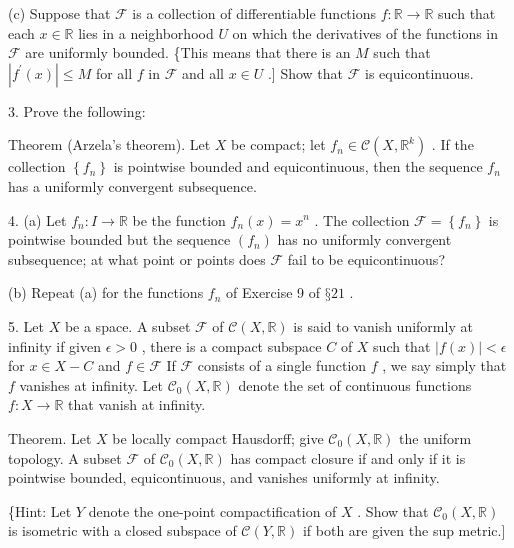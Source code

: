 (c) Suppose that \(\mathcal{F}\) is a collection of differentiable functions \(f : \mathbb{R} \rightarrow  \mathbb{R}\) such that each \(x \in  \mathbb{R}\) lies in a neighborhood \(U\) on which the derivatives of the functions in \(\mathcal{F}\) are uniformly bounded. \{This means that there is an \(M\) such that \(\left| {{f}^{\prime }\left( x\right) }\right|  \leq  M\) for all \(f\) in \(\mathcal{F}\) and all \(x \in  U\) .] Show that \(\mathcal{F}\) is equicontinuous.

3. Prove the following:

Theorem (Arzela’s theorem). Let \(X\) be compact; let \({f}_{n} \in  \mathcal{C}\left( {X,{\mathbb{R}}^{k}}\right)\) . If the collection \(\left\{  {f}_{n}\right\}\) is pointwise bounded and equicontinuous, then the sequence \({f}_{n}\) has a uniformly convergent subsequence.

4. (a) Let \({f}_{n} : I \rightarrow  \mathbb{R}\) be the function \({f}_{n}\left( x\right)  = {x}^{n}\) . The collection \(\mathcal{F} = \left\{  {f}_{n}\right\}\) is pointwise bounded but the sequence \(\left( {f}_{n}\right)\) has no uniformly convergent subsequence; at what point or points does \(\mathcal{F}\) fail to be equicontinuous?

(b) Repeat (a) for the functions \({f}_{n}\) of Exercise 9 of \(§{21}\) .

5. Let \(X\) be a space. A subset \(\mathcal{F}\) of \(\mathcal{C}\left( {X,\mathbb{R}}\right)\) is said to vanish uniformly at infinity if given \(\epsilon  > 0\) , there is a compact subspace \(C\) of \(X\) such that \(\left| {f\left( x\right) }\right|  < \epsilon\) for \(x \in  X - C\) and \(f \in  \mathcal{F}\) If \(\mathcal{F}\) consists of a single function \(f\) , we say simply that \(f\) vanishes at infinity. Let \({\mathcal{C}}_{0}\left( {X,\mathbb{R}}\right)\) denote the set of continuous functions \(f : X \rightarrow  \mathbb{R}\) that vanish at infinity.

Theorem. Let \(X\) be locally compact Hausdorff; give \({\mathcal{C}}_{0}\left( {X,\mathbb{R}}\right)\) the uniform topology. A subset \(\mathcal{F}\) of \({\mathcal{C}}_{0}\left( {X,\mathbb{R}}\right)\) has compact closure if and only if it is pointwise bounded, equicontinuous, and vanishes uniformly at infinity.

\{Hint: Let \(Y\) denote the one-point compactification of \(X\) . Show that \({\mathcal{C}}_{0}\left( {X,\mathbb{R}}\right)\) is isometric with a closed subspace of \(\mathcal{C}\left( {Y,\mathbb{R}}\right)\) if both are given the sup metric.]

